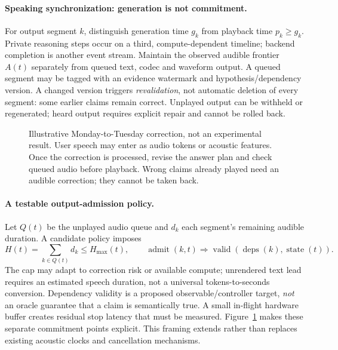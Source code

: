 \documentclass{article}
\begin{document}
\paragraph{Speaking synchronization: generation is not commitment.}
For output segment $k$, distinguish generation time $g_k$ from playback time $p_k\geq g_k$. Private reasoning steps occur on a third, compute-dependent timeline; backend completion is another event stream. Maintain the observed audible frontier $A(t)$ separately from queued text, codec and waveform output. A queued segment may be tagged with an evidence watermark and hypothesis/dependency version. A changed version triggers \emph{revalidation}, not automatic deletion of every segment: some earlier claims remain correct. Unplayed output can be withheld or regenerated; heard output requires explicit repair and cannot be rolled back.

\begin{figure}[htbp]
\centering

\caption{Illustrative Monday-to-Tuesday correction, not an experimental result. User speech may enter as audio tokens or acoustic features. Once the correction is processed, revise the answer plan and check queued audio before playback. Wrong claims already played need an audible correction; they cannot be taken back.}
\label{fig:clocks}
\end{figure}

\paragraph{A testable output-admission policy.}
Let $Q(t)$ be the unplayed audio queue and $d_k$ each segment's remaining audible duration. A candidate policy imposes
\begin{equation}
\label{eq:admission}
H(t)=\sum_{k\in Q(t)} d_k\leq H_{\max}(t),\qquad
\operatorname{admit}(k,t)\Rightarrow\operatorname{valid}(\operatorname{deps}(k),\operatorname{state}(t)).
\end{equation}
The cap may adapt to correction risk or available compute; unrendered text lead requires an estimated speech duration, not a universal tokens-to-seconds conversion. Dependency validity is a proposed observable/controller target, \emph{not} an oracle guarantee that a claim is semantically true. A small in-flight hardware buffer creates residual stop latency that must be measured. Figure~\ref{fig:clocks} makes these separate commitment points explicit. This framing extends rather than replaces existing acoustic clocks and cancellation mechanisms.
\end{document}
